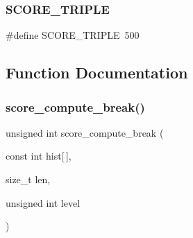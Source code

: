 \subsubsection{S\+C\+O\+R\+E\+\_\+\+T\+R\+I\+P\+LE}
{\footnotesize\ttfamily \#define S\+C\+O\+R\+E\+\_\+\+T\+R\+I\+P\+LE~500}



\subsection{Function Documentation}
\mbox{\label{score_8h_a2879d92d899fcd81e056a304c03b3698}} 
\subsubsection{score\+\_\+compute\+\_\+break()}
{\footnotesize\ttfamily unsigned int score\+\_\+compute\+\_\+break (\begin{DoxyParamCaption}\item[{const int}]{hist[$\,$],  }\item[{size\+\_\+t}]{len,  }\item[{unsigned int}]{level }\end{DoxyParamCaption})}

